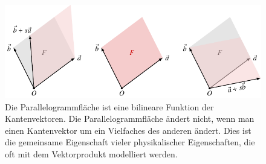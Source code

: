 %
%
%
\begin{figure}
\centering
\includegraphics{chapters/040-green/images/parallelogramm.pdf}
\caption{Die Parallelogrammfläche ist eine bilineare Funktion der
Kantenvektoren.
Die Parallelogrammfläche ändert nicht, wenn man einen Kantenvektor
um ein Vielfaches des anderen ändert.
Dies ist die gemeinsame Eigenschaft vieler physikalischer Eigenschaften,
die oft mit dem Vektorprodukt modelliert werden.
\label{buch:green:2vektoren:fig:parallelogramm}}
\end{figure}

